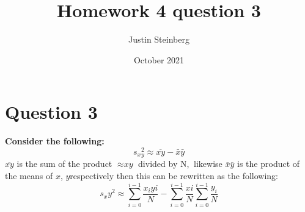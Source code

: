 \documentclass{article}
\title{Homework 4 question 3}
\author{Justin Steinberg}
\date{October 2021}
\begin{document}
\maketitle

\section{Question 3}
\textbf{Consider the following:}
\begin{equation}
    s_x{}_y^2 \approx \overline{xy} - \bar{x}\bar{y}
\end{equation}
$\overline{xy} $ is the sum of the product $\approx \textit{xy}$ divided by N,$ \ $ likewise $ \bar{x}\bar{y} $ is the product of the means of $ \textit{x} $, $ \textit{y} $respectively
then this can be rewritten as the following: 
\begin{equation}
   s_x{}y^2 \approx  \sum\limits_{i=0}^{i-1} \frac{x_i yi}{N} - \sum\limits_{i=0}^{i-1} \frac{xi}{N} \sum\limits_{i=0}^{i-1} \frac{y_i}{N}
\end{equation}
\end{document}
